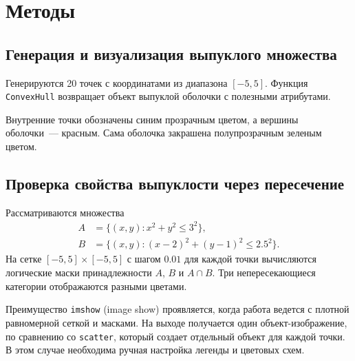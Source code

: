 \section{Методы}

\subsection{Генерация и визуализация выпуклого множества}

Генерируются 20 точек с координатами из диапазона $[-5,5]$. Функция
\texttt{ConvexHull} возвращает объект выпуклой оболочки с полезными атрибутами.


Внутренние точки обозначены синим прозрачным цветом, а вершины
оболочки~--- красным. Сама оболочка закрашена полупрозрачным
зеленым цветом.

\subsection{Проверка свойства выпуклости через пересечение}

Рассматриваются множества
\begin{align*}
    A &= \{(x,y) : x^2 + y^2 \leq 3^2\}, \\
    B &= \{(x,y) : (x-2)^2 + (y-1)^2 \leq 2.5^2\}.
\end{align*}
На сетке $[-5,5]\times[-5,5]$ с шагом $0.01$ для каждой точки вычисляются логические маски принадлежности $A$, $B$ и $A\cap B$. Три непересекающиеся категории отображаются разными цветами.


Преимущество \texttt{imshow} (image show) проявляется, когда работа
ведется с плотной равномерной сеткой и масками. На выходе получается
один объект-изображение, по сравнению со \texttt{scatter}, который
создает отдельный объект для каждой точки. В этом случае необходима
ручная настройка легенды и цветовых схем.




